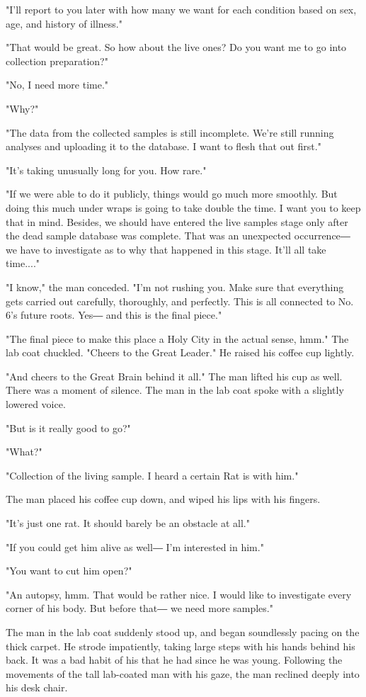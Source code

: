 "I'll report to you later with how many we want for each condition based
on sex, age, and history of illness."

"That would be great. So how about the live ones? Do you want me to go
into collection preparation?"

"No, I need more time."

"Why?"

"The data from the collected samples is still incomplete. We're still
running analyses and uploading it to the database. I want to flesh that
out first."

"It's taking unusually long for you. How rare."

"If we were able to do it publicly, things would go much more smoothly.
But doing this much under wraps is going to take double the time. I want
you to keep that in mind. Besides, we should have entered the live
samples stage only after the dead sample database was complete. That was
an unexpected occurrence― we have to investigate as to why that happened
in this stage. It'll all take time...."

"I know," the man conceded. "I'm not rushing you. Make sure that
everything gets carried out carefully, thoroughly, and perfectly. This
is all connected to No. 6's future roots. Yes― and this is the final
piece."

"The final piece to make this place a Holy City in the actual sense,
hmm." The lab coat chuckled. "Cheers to the Great Leader." He raised his
coffee cup lightly.

"And cheers to the Great Brain behind it all." The man lifted his cup as
well. There was a moment of silence. The man in the lab coat spoke with
a slightly lowered voice.

"But is it really good to go?"

"What?"

"Collection of the living sample. I heard a certain Rat is with him."

The man placed his coffee cup down, and wiped his lips with his fingers.

"It's just one rat. It should barely be an obstacle at all."

"If you could get him alive as well― I'm interested in him."

"You want to cut him open?"

"An autopsy, hmm. That would be rather nice. I would like to investigate
every corner of his body. But before that― we need more samples."

The man in the lab coat suddenly stood up, and began soundlessly pacing
on the thick carpet. He strode impatiently, taking large steps with his
hands behind his back. It was a bad habit of his that he had since he
was young. Following the movements of the tall lab-coated man with his
gaze, the man reclined deeply into his desk chair.

